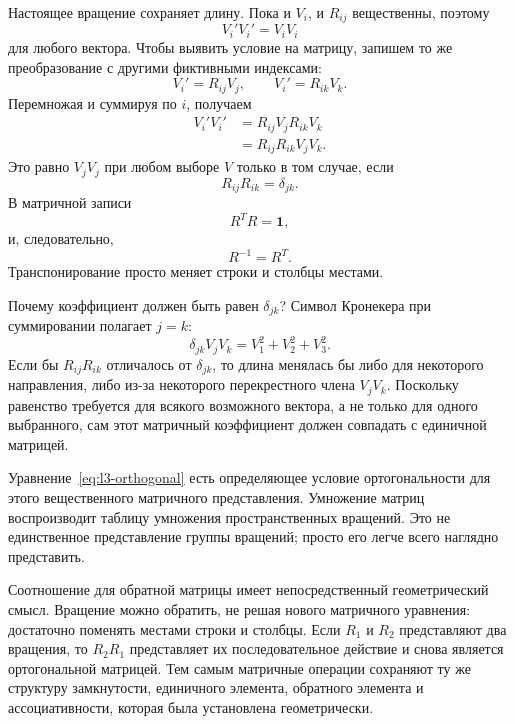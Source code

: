 Настоящее вращение сохраняет длину. Пока и \(V_i\), и \(R_{ij}\) вещественны, поэтому
\begin{equation}
V_i'V_i'=V_iV_i
\end{equation}
для любого вектора. Чтобы выявить условие на матрицу, запишем то же преобразование с другими фиктивными индексами:
\begin{equation}
V_i'=R_{ij}V_j,\qquad V_i'=R_{ik}V_k.
\end{equation}
Перемножая и суммируя по \(i\), получаем
\begin{align}
V_i'V_i'
 &=R_{ij}V_jR_{ik}V_k\\
 &=R_{ij}R_{ik}V_jV_k.
\end{align}
Это равно \(V_jV_j\) при любом выборе \(V\) только в том случае, если
\begin{equation}
R_{ij}R_{ik}=\delta_{jk}.
\label{eq:l3-orthogonality-index}
\end{equation}
В матричной записи
\begin{equation}
R^TR=\boldsymbol 1,
\label{eq:l3-orthogonal}
\end{equation}
и, следовательно,
\begin{equation}
R^{-1}=R^T.
\end{equation}
Транспонирование просто меняет строки и столбцы местами.

Почему коэффициент должен быть равен \(\delta_{jk}\)? Символ Кронекера при суммировании полагает \(j=k\):
\begin{equation}
\delta_{jk}V_jV_k=V_1^2+V_2^2+V_3^2.
\end{equation}
Если бы \(R_{ij}R_{ik}\) отличалось от \(\delta_{jk}\), то длина менялась бы либо для некоторого направления, либо из-за некоторого перекрестного члена \(V_jV_k\). Поскольку равенство требуется для всякого возможного вектора, а не только для одного выбранного, сам этот матричный коэффициент должен совпадать с единичной матрицей.

Уравнение~\eqref{eq:l3-orthogonal} есть определяющее условие ортогональности для этого вещественного матричного представления. Умножение матриц воспроизводит таблицу умножения пространственных вращений. Это не единственное представление группы вращений; просто его легче всего наглядно представить.

Соотношение для обратной матрицы имеет непосредственный геометрический смысл. Вращение можно обратить, не решая нового матричного уравнения: достаточно поменять местами строки и столбцы. Если \(R_1\) и \(R_2\) представляют два вращения, то \(R_2R_1\) представляет их последовательное действие и снова является ортогональной матрицей. Тем самым матричные операции сохраняют ту же структуру замкнутости, единичного элемента, обратного элемента и ассоциативности, которая была установлена геометрически.

